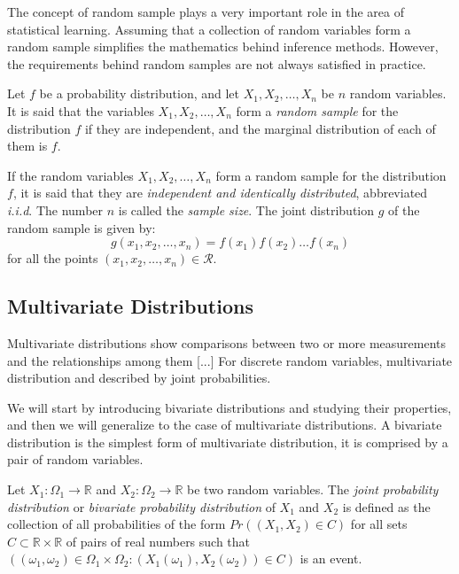 The concept of random sample plays a very important role in the area of statistical learning. Assuming that a collection of random variables form a random sample simplifies the mathematics behind inference methods. However, the requirements behind random samples are not always satisfied in practice.

\begin{definition}
Let $f$ be a probability distribution, and let $X_1, X_2, \ldots, X_n$ be $n$ random variables. It is said that the variables $X_1, X_2, \ldots, X_n$ form a \emph{random sample} for the distribution $f$ if they are independent, and the marginal distribution of each of them is $f$. 
\end{definition}

If the random variables $X_1, X_2, \ldots, X_n$ form a random sample for the distribution $f$, it is said that they are \emph{independent and identically distributed}, abbreviated \emph{i.i.d}. The number $n$ is called the \emph{sample size}. The joint distribution $g$ of the random sample is given by:
\[
g \left( x_1, x_2, \ldots, x_n \right) = f \left( x_1 \right) f \left( x_2 \right) \ldots f \left( x_n \right)
\]
for all the points $\left( x_1, x_2, \ldots, x_n \right) \in \mathcal{R}$.


\subsection{Multivariate Distributions}

{\color{red} Multivariate distributions show comparisons between two or more measurements and the relationships among them [...]  For discrete random variables, multivariate distribution and described by joint probabilities.}

We will start by introducing bivariate distributions and studying their properties, and then we will generalize to the case of multivariate distributions. A bivariate distribution is the simplest form of multivariate distribution, it is comprised by a pair of random variables.

\begin{definition}
Let $X_1 : \Omega_1 \rightarrow \mathbb{R}$ and $X_2 : \Omega_2 \rightarrow \mathbb{R}$ be two random variables. The \emph{joint probability distribution} or \emph{bivariate probability distribution} of $X_1$ and $X_2$ is defined as the collection of all probabilities of the form $Pr\left( \left( X_1, X_2 \right) \in C \right)$ for all sets $C \subset \mathbb{R} \times \mathbb{R}$ of pairs of real numbers such that $\left( \left( \omega_1, \omega_2 \right) \in \Omega_1 \times \Omega_2: \left( X_1 \left( \omega_1 \right), X_2 \left( \omega_2 \right) \right) \in C \right)$ is an event.
\end{definition}

